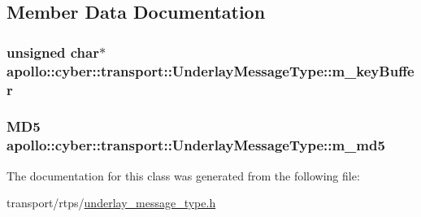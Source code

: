 \subsection{Member Data Documentation}
\hypertarget{classapollo_1_1cyber_1_1transport_1_1UnderlayMessageType_a70946fdd8679f584bb8bd917cc845a21}{
\subsubsection[{m\-\_\-key\-Buffer}]{\setlength{\rightskip}{0pt plus 5cm}unsigned char$\ast$ apollo\-::cyber\-::transport\-::\-Underlay\-Message\-Type\-::m\-\_\-key\-Buffer}}\label{classapollo_1_1cyber_1_1transport_1_1UnderlayMessageType_a70946fdd8679f584bb8bd917cc845a21}
\hypertarget{classapollo_1_1cyber_1_1transport_1_1UnderlayMessageType_ad0c794c245214421d0a93f1c9df6ca03}{
\subsubsection[{m\-\_\-md5}]{\setlength{\rightskip}{0pt plus 5cm}M\-D5 apollo\-::cyber\-::transport\-::\-Underlay\-Message\-Type\-::m\-\_\-md5}}\label{classapollo_1_1cyber_1_1transport_1_1UnderlayMessageType_ad0c794c245214421d0a93f1c9df6ca03}


The documentation for this class was generated from the following file\-:\begin{DoxyCompactItemize}
\item 
transport/rtps/\hyperlink{underlay__message__type_8h}{underlay\-\_\-message\-\_\-type.\-h}\end{DoxyCompactItemize}
